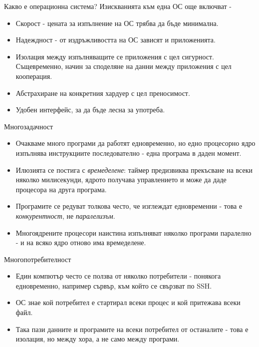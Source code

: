 \documentclass[14pt, aspectratio=169]{beamer}
\begin{document}
\begin{frame}{Какво е операционна система?}
  Изискванията към една ОС още включват -
  \begin{itemize}
    \item Скорост - цената за изпълнение на ОС трябва да бъде минимална.
    \item Надеждност - от издръжливостта на ОС зависят и приложенията.
    \item Изолация между изпълняващите се приложения с цел сигурност.
      Същевременно, начин за споделяне на данни между приложения с цел
      кооперация.
    \item Абстрахиране на конкретния хардуер с цел преносимост.
    \item Удобен интерфейс, за да бъде лесна за употреба.
  \end{itemize}
\end{frame}

\begin{frame}{Многозадачност}
  \begin{itemize}
    \item Очакваме много програми да работят едновременно, но едно процесорно
      ядро изпълнява инструкциите последователно - една програма в даден
      момент.
    \item Илюзията се постига с \emph{времеделене}: таймер предизвиква
      прекъсване на всеки няколко милисекунди, ядрото получава управлението и
      може да даде процесора на друга програма.
    \item Програмите се редуват толкова често, че изглеждат едновременни -
      това е \emph{конкурентност}, не \emph{паралелизъм}.
    \item Многоядрените процесори наистина изпълняват няколко програми
      паралелно - и на всяко ядро отново има времеделене.
  \end{itemize}
\end{frame}

\begin{frame}{Многопотребителност}
  \begin{itemize}
    \item Един компютър често се ползва от няколко потребители - понякога
      едновременно, например сървър, към който се свързват по SSH.
    \item ОС знае кой потребител е стартирал всеки процес и кой притежава
      всеки файл.
    \item Така пази данните и програмите на всеки потребител от останалите -
      това е изолация, но между хора, а не само между програми.
  \end{itemize}
\end{frame}
\end{document}
